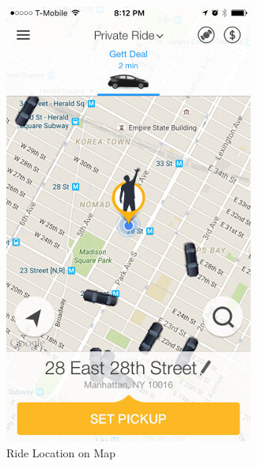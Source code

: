 \documentclass[a4paper, 12pt]{report} %
\begin{document}
                \begin{figure}[htp]
                    \centering
                    \begin{subfigure}{0.4\textwidth}
                        \includegraphics[width=0.8\linewidth, height=0.9\textheight, keepaspectratio]{Images/Gett_Map.jpeg}
                        \caption{Ride Location on Map}
                        \label{gett_map}
                    \end{subfigure}
                    \begin{subfigure}{0.4\textwidth}

\end{subfigure}
\end{figure}
\end{document}
